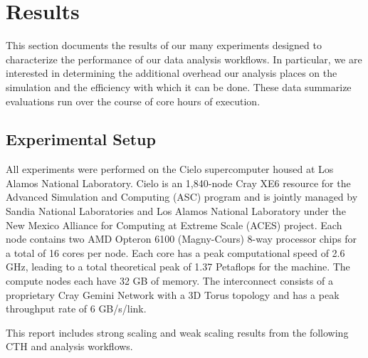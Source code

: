 \section{Results}
\label{sec:Results}

This section documents the results of our many experiments designed to
characterize the performance of our data analysis workflows.  In
particular, we are interested in determining the additional overhead our
analysis places on the simulation and the efficiency with which it can be
done.  These data summarize evaluations run over the course of  core hours of execution.

\subsection{Experimental Setup}

All experiments were performed on the Cielo supercomputer housed at Los Alamos
National Laboratory.  Cielo is an 1,840-node Cray XE6 resource for the Advanced
Simulation and Computing (ASC) program and is jointly managed by Sandia National 
Laboratories and Los Alamos National Laboratory under the New Mexico
Alliance for Computing at Extreme Scale (ACES) project.  Each node contains
two AMD Opteron 6100 (Magny-Cours) 8-way processor chips for a total of 16 cores
per node.  Each core has a peak computational speed of 2.6 GHz, leading to a total 
theoretical peak of 1.37 Petaflops for the machine. The compute nodes each
have 32 GB of memory.  The interconnect consists of a proprietary Cray Gemini
Network with a 3D Torus topology and has a peak throughput rate of 6 GB/s/link. 

This report includes strong scaling and weak scaling results from the
following CTH and analysis workflows.

